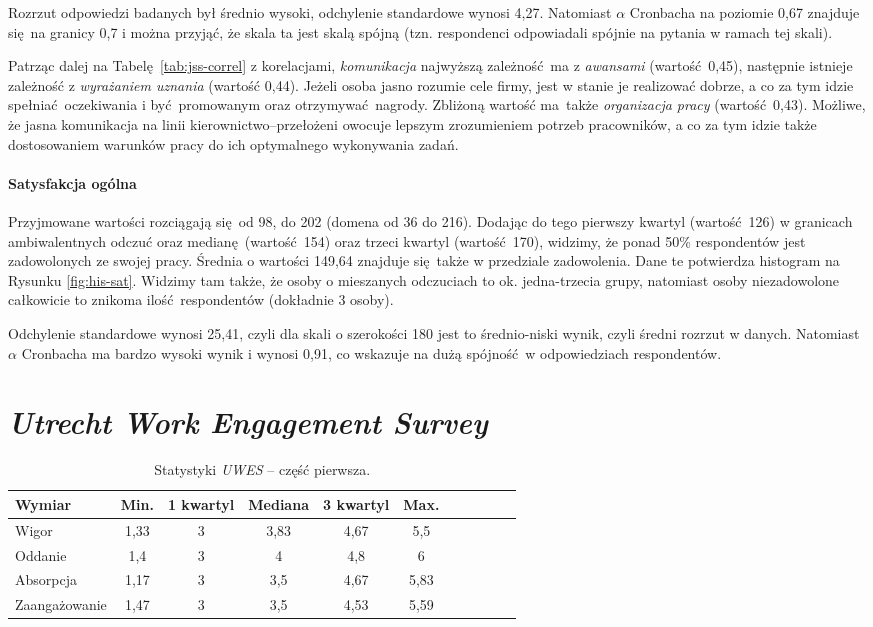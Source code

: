 Rozrzut odpowiedzi badanych był średnio wysoki, odchylenie standardowe wynosi 4,27. Natomiast $\alpha$ Cronbacha na poziomie 0,67 znajduje się na granicy 0,7 i można przyjąć, że skala ta jest skalą spójną (tzn. respondenci odpowiadali spójnie na pytania w ramach tej skali).

Patrząc dalej na Tabelę \ref{tab:jss-correl} z korelacjami, \textit{komunikacja} najwyższą zależność ma z \textit{awansami} (wartość 0,45), następnie istnieje zależność z \textit{wyrażaniem uznania} (wartość 0,44). Jeżeli osoba jasno rozumie cele firmy, jest w stanie je realizować dobrze, a co za tym idzie spełniać oczekiwania i być promowanym oraz otrzymywać nagrody. Zbliżoną wartość ma także \textit{organizacja pracy} (wartość 0,43). Możliwe, że jasna komunikacja na linii
kierownictwo--przełożeni owocuje lepszym zrozumieniem potrzeb pracowników, a co za tym idzie także dostosowaniem warunków pracy do ich optymalnego wykonywania zadań.

\paragraph{Satysfakcja ogólna}
Przyjmowane wartości rozciągają się od 98, do 202 (domena od 36 do 216). Dodając do tego pierwszy kwartyl (wartość 126) w granicach ambiwalentnych odczuć oraz medianę (wartość 154) oraz trzeci kwartyl (wartość 170), widzimy, że ponad 50\% respondentów jest zadowolonych ze swojej pracy. Średnia o wartości 149,64 znajduje się także w przedziale zadowolenia. Dane te potwierdza histogram na Rysunku \ref{fig:his-sat}. Widzimy tam także, że osoby o mieszanych odczuciach to ok.
jedna-trzecia grupy, natomiast osoby niezadowolone całkowicie to znikoma ilość respondentów (dokładnie 3 osoby).

Odchylenie standardowe wynosi 25,41, czyli dla skali o szerokości 180 jest to średnio-niski wynik, czyli średni rozrzut w danych. Natomiast $\alpha$ Cronbacha ma bardzo wysoki wynik i wynosi 0,91, co wskazuje na dużą spójność w odpowiedziach respondentów.

\section{\emph{Utrecht Work Engagement Survey}}

\begin{table}[h!]
\begin{center}
\begin{tabular}{l | c c c c c c c c c c}
Wymiar & Min. & 1 kwartyl & Mediana & 3 kwartyl & Max.\\ \hline \hline
Wigor & 1,33 & 3 & 3,83 & 4,67 & 5,5 \\
Oddanie & 1,4 & 3 & 4 & 4,8 & 6 \\
Absorpcja & 1,17 & 3 & 3,5 & 4,67 & 5,83 \\ \hline
Zaangażowanie & 1,47 & 3 & 3,5 & 4,53 & 5,59 \\
\end{tabular}
\end{center}
\caption{Statystyki \emph{UWES} -- część pierwsza.}
\label{tab:uwes-stats-1}
\end{table}

